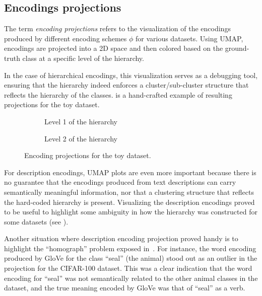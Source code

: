 \subsection{Encodings projections}
\label{subsec:encodings-projections}
The term \emph{encoding projections} refers to the visualization of the encodings produced by different encoding schemes $\phi$ for various datasets. Using UMAP, encodings are projected into a 2D space and then colored based on the ground-truth class at a specific level of the hierarchy.

In the case of hierarchical encodings, this visualization serves as a debugging tool, ensuring that the hierarchy indeed enforces a cluster/sub-cluster structure that reflects the hierarchy of the classes.  is a hand-crafted example of resulting projections for the toy dataset.

\begin{figure}[ht]
  \centering
  \begin{subfigure}{0.45\textwidth}
    \caption{Level 1 of the hierarchy}
    \label{fig:04/hierarchical-encodings-projections-lvl1}
  \end{subfigure}
  \begin{subfigure}{0.45\textwidth}
    \caption{Level 2 of the hierarchy}
    \label{fig:04/hierarchical-encodings-projections-lvl2}
  \end{subfigure}
  \caption{Encoding projections for the toy dataset.}
  \label{fig:04/hierarchical-encodings-projections}
\end{figure}

For description encodings, UMAP plots are even more important because there is no guarantee that the encodings produced from text descriptions can carry semantically meaningful information, nor that a clustering structure that reflects the hard-coded hierarchy is present. Visualizing the description encodings proved to be useful to highlight some ambiguity in how the hierarchy was constructed for some datasets (see ).

Another situation where description encoding projection proved handy is to highlight the ``homograph'' problem exposed in~. For instance, the word encoding produced by GloVe for the class ``seal'' (the animal) stood out as an outlier in the projection for the CIFAR-100 dataset. This was a clear indication that the word encoding for ``seal'' was not semantically related to the other animal classes in the dataset, and the true meaning encoded by GloVe was that of ``seal'' as a verb.

